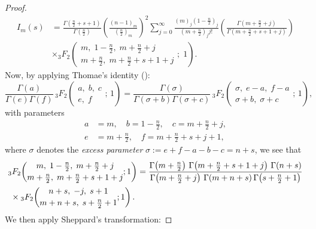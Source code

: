 \documentclass{article}
\theoremstyle{boldremark}
\renewcommand\[{\begin{equation}}
\renewcommand\]{\end{equation}}
\theoremstyle{definition}
\numberwithin{equation}{section}
\begin{document}
\begin{proof}
\begin{align}
I_m(s) 
&= \frac{\Gamma(\frac{n}{2} + s + 1)}{\Gamma(\frac{n}{2})} \left( \frac{(n-1)_m}{(\frac{n}{2})_m} \right)^2 \sum_{j=0}^{\infty} \frac{(m)_j (1 - \frac{n}{2})_j}{(m + \frac{n}{2})_j j!} \left( \frac{\Gamma(m + \frac{n}{2} + j)}{\Gamma(m + \frac{n}{2} + s + 1 + j)} \right)  \\\label{suma3F2}
&\times {}_3F_2\left(
\begin{matrix}
m,\; 1 - \frac{n}{2},\; m+\frac{n}{2}+j\\
m + \frac{n}{2},\; m+\frac{n}{2}+s+1+j
\end{matrix}
;\; 1
\right).
\end{align}
Now, by applying Thomae's identity (\cite[p. 14, eq. 2]{bailey1935}):
\begin{equation}\label{Thomae}
\frac{\Gamma(a)}{\Gamma(e)\Gamma(f)}\,
{}_3F_2\!\left(\begin{matrix}
a,\; b,\; c\\
e,\; f
\end{matrix};\,1\right)
=
\frac{\Gamma(\sigma)}{\Gamma(\sigma+b)\Gamma(\sigma+c)}\,
{}_3F_2\!\left(\begin{matrix}
\sigma,\; e-a,\; f-a\\
\sigma+b,\; \sigma+c
\end{matrix};\,1\right),
\end{equation}
with parameters
\begin{align*}
    a &= m, \quad b = 1 - \frac{n}{2}, \quad c = m + \frac{n}{2} + j, \\
    e &= m + \frac{n}{2}, \quad f = m + \frac{n}{2} + s + j + 1,
\end{align*}
where $\sigma$ denotes the \textit{excess parameter} $\sigma := e+f-a-b-c = n+s$, we see that
\begin{align}\label{3F2}
&{}_3F_2\!\left(
\begin{matrix}
m,\; 1-\frac n2,\; m+\frac n2+j\\[2pt]
m+\frac n2,\; m+\frac n2+s+1+j
\end{matrix};1\right)
=
\frac{
\Gamma\!\left(m+\frac n2\right)\,
\Gamma\!\left(m+\frac n2+s+1+j\right)\,
\Gamma(n+s)
}{
\Gamma\!\left(m+\frac n2+j\right)\,
\Gamma(m+n+s)\,
\Gamma\!\left(s+\frac n2+1\right)
}\\\notag
&
\;\times
{}_3F_2\!\left(
\begin{matrix}
n+s,\; -j,\; s+1\\[2pt]
m+n+s,\; s+\frac n2+1
\end{matrix};1\right).
\end{align}
We then apply Sheppard’s transformation:

\end{proof}
\end{document}
